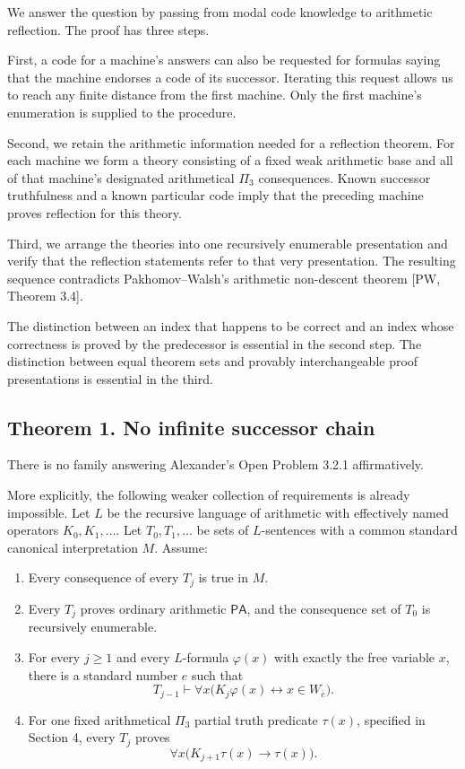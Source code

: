 \documentclass[
  11pt,
  letterpaper,
]{article}
\providecommand{\tightlist}{%
  \setlength{\itemsep}{0pt}\setlength{\parskip}{0pt}}
\begin{document}
We answer the question by passing from modal code knowledge to
arithmetic reflection. The proof has three steps.

First, a code for a machine's answers can also be requested for formulas
saying that the machine endorses a code of its successor. Iterating this
request allows us to reach any finite distance from the first machine.
Only the first machine's enumeration is supplied to the procedure.

Second, we retain the arithmetic information needed for a reflection
theorem. For each machine we form a theory consisting of a fixed weak
arithmetic base and all of that machine's designated arithmetical
\(\Pi_3\) consequences. Known successor truthfulness and a known
particular code imply that the preceding machine proves reflection for
this theory.

Third, we arrange the theories into one recursively enumerable
presentation and verify that the reflection statements refer to that
very presentation. The resulting sequence contradicts Pakhomov--Walsh's
arithmetic non-descent theorem {[}PW, Theorem 3.4{]}.

The distinction between an index that happens to be correct and an index
whose correctness is proved by the predecessor is essential in the
second step. The distinction between equal theorem sets and provably
interchangeable proof presentations is essential in the third.

\subsection{Theorem 1. No infinite successor
chain}\label{theorem-1.-no-infinite-successor-chain}

There is no family answering Alexander's Open Problem 3.2.1
affirmatively.

More explicitly, the following weaker collection of requirements is
already impossible. Let \(L\) be the recursive language of arithmetic
with effectively named operators \(K_0,K_1,\ldots\). Let
\(T_0,T_1,\ldots\) be sets of \(L\)-sentences with a common standard
canonical interpretation \(M\). Assume:

\begin{enumerate}
\def\labelenumi{\arabic{enumi}.}
\tightlist
\item
  Every consequence of every \(T_j\) is true in \(M\).
\item
  Every \(T_j\) proves ordinary arithmetic \(\mathsf{PA}\), and the
  consequence set of \(T_0\) is recursively enumerable.
\item
  For every \(j\geq 1\) and every \(L\)-formula \(\varphi(x)\) with
  exactly the free variable \(x\), there is a standard number \(e\) such
  that \[
  T_{j-1}\vdash
  \forall x\bigl(K_j\varphi(x)\leftrightarrow x\in W_{\bar e}\bigr).
  \tag{1}
  \]
\item
  For one fixed arithmetical \(\Pi_3\) partial truth predicate
  \(\tau(x)\), specified in Section 4, every \(T_j\) proves \[
  \forall x\bigl(K_{j+1}\tau(x)\rightarrow\tau(x)\bigr).
  \tag{2}
  \]
\end{enumerate}
\end{document}
